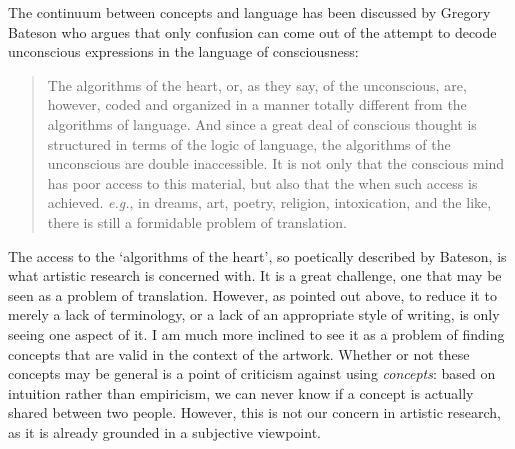 \documentclass[12pt]{article}
\begin{document}

The continuum between concepts and language has been discussed by Gregory Bateson who argues that only confusion can come out of the attempt to decode unconscious expressions in the language of consciousness: 


\begin{quote}
The algorithms of the heart, or, as they say, of the unconscious, are, however, coded and organized in a manner totally different from the algorithms of language. And since a great deal of conscious thought is structured in terms of the logic of language, the algorithms of the unconscious are double inaccessible. It is not only that the conscious mind has poor access to this material, but also that the when such access is achieved. \emph{e.g.}, in dreams, art, poetry, religion, intoxication, and the like, there is still a formidable problem of translation.
\end{quote}

The access to the `algorithms of the heart', so poetically described by Bateson, is what artistic research is concerned with. It is a great challenge, one that may be seen as a problem of translation. However, as pointed out above, to reduce it to merely a lack of terminology, or a lack of an appropriate style of writing, is only seeing one aspect of it. I am much more inclined to see it as a problem of finding concepts that are valid in the context of the artwork. Whether or not these concepts may be general is a point of criticism against using \emph{concepts}: based on intuition rather than empiricism, we can never know if a concept is actually shared between two people. However, this is not our concern in artistic research, as it is already grounded in a subjective viewpoint.
\end{document}

